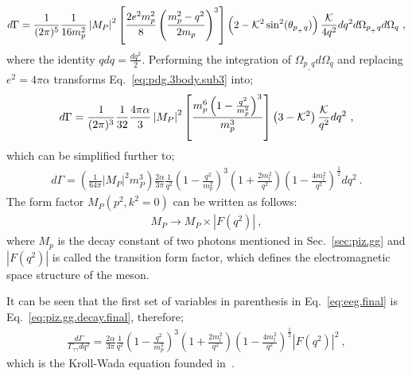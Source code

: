 \begin{align}\label{eq:pdg.3body.sub3}
d\Gamma = \frac{1}{(2 \pi)^5} \frac{1}{16 m_p^2} \left|M_{P}\right|^{2} \left[ \frac{2e^2 m_p^2}{8} \left( \frac{m_p^2 - q^2}{2 m_p}\right)^3\right]\left( 2 -{\cal K}^2\sin^2(\theta_{p_{_+}q})\right)\frac{{\cal K}}{4 q^2}dq^2d\Omega_{p_{_+}q}d\Omega_q \ ,
\end{align}
where the identity $qdq = \frac{dq^2}{2}$. Performing the integration of $\Omega_{p_{_+}q}d\Omega_q$ and replacing $e^2 = 4\pi\alpha$ transforms Eq.~\ref{eq:pdg.3body.sub3} into;
\begin{align}\label{eq:pdg.3body.sub4}
d\Gamma = \frac{1}{(2 \pi)^3} \frac{1}{32} \frac{4 \pi \alpha}{3} \left|M_{P}\right|^{2} \left[ \frac{m_p^6 \left( 1- \frac{q^2}{m_p^2}\right)^3}{m_p^3} \right]\left( 3 -{\cal K}^2\right)\frac{{\cal K}}{q^2}dq^2\ ,
\end{align}
which can be simplified further to;
\begin{align}\label{eq:eeg.final}
d\Gamma = \left(\frac{1}{64\pi} \left|M_{P}\right|^{2}m_{P}^{3} \right) \frac{2 \alpha}{3 \pi} \frac{1}{q^2} \left( 1- \frac{q^2}{m_p^2}\right)^3 \left( 1+ \frac{2m_l^2}{q^2}\right) \left( 1- \frac{4m_l^2}{q^2}\right)^{\frac{1}{2}} dq^2\ .
\end{align}
%
The form factor ${M}_P(p^2,k^2=0)$ can be written as follows:
\begin{align}
 {M}_P \to {M}_P \times \left|F(q^2)\right| \ ,
\end{align}
where $M_p$ is the decay constant of two photons mentioned in Sec.~\ref{sec:piz.gg} and $\left|F(q^2)\right|$ is called the transition form factor, which defines the electromagnetic space structure of the meson. 

It can be seen that the first set of variables in parenthesis in Eq.~\ref{eq:eeg.final} is Eq.~\ref{eq:piz.gg.decay.final}, therefore;
\begin{align}\label{eq:eegff.final}
\frac{d\Gamma}{\Gamma_{\gamma\gamma} dq^2} = \frac{2 \alpha}{3 \pi} \frac{1}{q^2} \left( 1- \frac{q^2}{m_p^2}\right)^3 \left( 1+ \frac{2m_l^2}{q^2}\right) \left( 1- \frac{4m_l^2}{q^2}\right)^{\frac{1}{2}} \left|F(q^2)\right|^2 \ ,
\end{align}
which is the Kroll-Wada equation founded in~\cite{KrollWada}.

